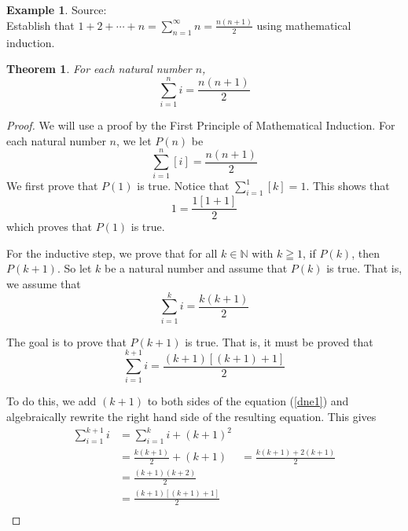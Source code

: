 \documentclass{book}
\newtheorem{theorem}{Theorem}[section]
\theoremstyle{definition}
\newtheorem{example}{Example}[definition]
\theoremstyle{remark}
\newcommand{\bb}[1]{\mathbb{#1}}
\begin{document}
\begin{example}
Source: \cite[Chap.1, S.1.1, Prob.1.1, Q.1.A]{david} \\ 

Establish that $1 + 2 + \cdots + n = \sum_{n=1}^{\infty} n = \frac{n(n+1)}{2}$ using mathematical induction.
    \begin{tcolorbox}
        \begin{theorem}
            For each natural number $n$,
                \begin{equation*}
                     \sum_{i=1}^{n}{i} = \frac{n(n+1)}{2}
                \end{equation*}
        \end{theorem}
    \end{tcolorbox}

    \begin{proof}
        We will use a proof by the First Principle of Mathematical Induction. For each natural number $n$, we let $P(n)$ be
            \begin{equation*}
                \sum_{i=1}^{n}{[i]} = \frac{n(n+1)}{2} 
            \end{equation*}
        We first prove that $P(1)$ is true. Notice that $\sum_{i=1}^{1}{[k]} = 1$. This shows that   
            \begin{equation*}
                 1 = \frac{1[1+1]}{2}
            \end{equation*}
        which proves that $P(1)$ is true. 
        
        For the inductive step, we prove that for all $k \in \bb{N}$ with $k \geqq 1$, if $P(k)$, then $P(k+1)$. So let $k$ be a natural number and assume that $P(k)$ is true. That is, we assume that 
            \begin{equation*}
               \sum_{i=1}^{k}{i} = \frac{k(k+1)}{2} 
            \end{equation*}
        
        The goal is to prove that $P(k+1)$ is true. That is, it must be proved that  
            \begin{equation}
            \label{dne1}
                \sum_{i=1}^{k+1}{i} = \frac{(k+1)[(k+1)+1]}{2} 
            \end{equation}
        
        To do this, we add $(k+1)$ to both sides of the equation (\ref{dne1}) and algebraically rewrite the right hand side of the resulting equation. This gives
            \begin{align*}
                \sum_{i=1}^{k+1}{i} & = \sum_{i=1}^{k}{i} + (k+1)^2 \\
                    & = \frac{k(k+1)}{2} + (k+1) 
                    & = \frac{k(k+1) + 2(k+1)}{2} \\
                    & = \frac{(k+1)(k+2)}{2} \\
                    & = \frac{(k+1)[(k+1)+1]}{2} \\
            \end{align*}
        

\end{proof}
\end{example}
\end{document}
